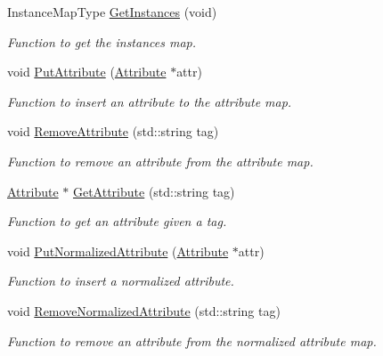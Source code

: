 \begin{DoxyCompactItemize}
InstanceMapType \hyperlink{class_series_a477adb122bfcd6a3d5bb13f6c0f1020c}{GetInstances} (void)
\begin{DoxyCompactList}\small\item\em Function to get the instances map. \item\end{DoxyCompactList}\item 
void \hyperlink{class_series_af83d6cca57fe8fdf40825119dbaf885c}{PutAttribute} (\hyperlink{class_attribute}{Attribute} $\ast$attr)
\begin{DoxyCompactList}\small\item\em Function to insert an attribute to the attribute map. \item\end{DoxyCompactList}\item 
void \hyperlink{class_series_a60b4d0753384cccc6f118eb231f6e3be}{RemoveAttribute} (std::string tag)
\begin{DoxyCompactList}\small\item\em Function to remove an attribute from the attribute map. \item\end{DoxyCompactList}\item 
\hyperlink{class_attribute}{Attribute} $\ast$ \hyperlink{class_series_ad87d11b1791521af0b9b68bc024ac4cd}{GetAttribute} (std::string tag)
\begin{DoxyCompactList}\small\item\em Function to get an attribute given a tag. \item\end{DoxyCompactList}\item 
void \hyperlink{class_series_a73306c9b62629112b88a8022845e44ae}{PutNormalizedAttribute} (\hyperlink{class_attribute}{Attribute} $\ast$attr)
\begin{DoxyCompactList}\small\item\em Function to insert a normalized attribute. \item\end{DoxyCompactList}\item 
void \hyperlink{class_series_a603d150125d57d98d065f64b5c4b916e}{RemoveNormalizedAttribute} (std::string tag)
\begin{DoxyCompactList}\small\item\em Function to remove an attribute from the normalized attribute map. \item\end{DoxyCompactList}\item 

\end{DoxyCompactItemize}
